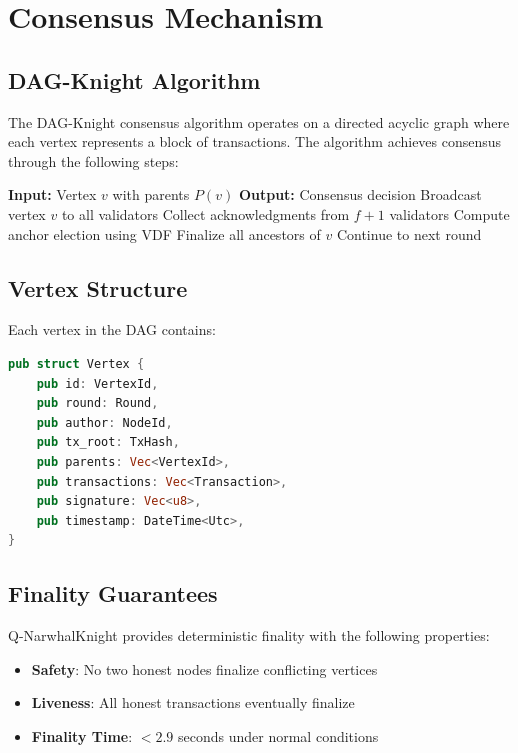 \documentclass[11pt,a4paper]{article}
\begin{document}
\section{Consensus Mechanism}

\subsection{DAG-Knight Algorithm}

The DAG-Knight consensus algorithm operates on a directed acyclic graph where each vertex represents a block of transactions. The algorithm achieves consensus through the following steps:

\begin{algorithm}
\caption{DAG-Knight Consensus}
\begin{algorithmic}[1]
\STATE \textbf{Input:} Vertex $v$ with parents $P(v)$
\STATE \textbf{Output:} Consensus decision
\STATE Broadcast vertex $v$ to all validators
\STATE Collect acknowledgments from $f+1$ validators
\STATE Compute anchor election using VDF
    \STATE Finalize all ancestors of $v$
\ENDIF
\STATE Continue to next round
\end{algorithmic}
\end{algorithm}

\subsection{Vertex Structure}

Each vertex in the DAG contains:

\begin{lstlisting}[language=Rust]
pub struct Vertex {
    pub id: VertexId,
    pub round: Round,
    pub author: NodeId,
    pub tx_root: TxHash,
    pub parents: Vec<VertexId>,
    pub transactions: Vec<Transaction>,
    pub signature: Vec<u8>,
    pub timestamp: DateTime<Utc>,
}
\end{lstlisting}

\subsection{Finality Guarantees}

Q-NarwhalKnight provides deterministic finality with the following properties:
\begin{itemize}
    \item \textbf{Safety}: No two honest nodes finalize conflicting vertices
    \item \textbf{Liveness}: All honest transactions eventually finalize
    \item \textbf{Finality Time}: $< 2.9$ seconds under normal conditions
\end{itemize}
\end{document}
